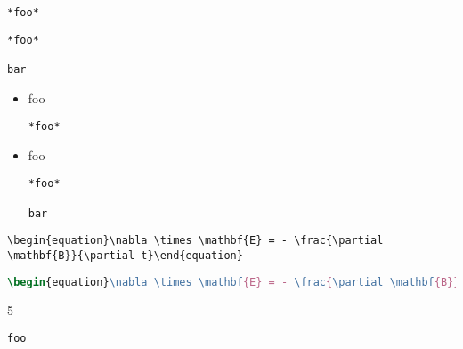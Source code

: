 
\def\mytitle{Fenced Code Blocks}


\begin{verbatim}
*foo*
\end{verbatim}

\begin{verbatim}
*foo*

bar
\end{verbatim}

\begin{itemize}
\item foo

\begin{verbatim}
*foo*
\end{verbatim}

\item foo

\begin{verbatim}
*foo*

bar
\end{verbatim}

\end{itemize}

\begin{verbatim}
\begin{equation}\nabla \times \mathbf{E} = - \frac{\partial \mathbf{B}}{\partial t}\end{equation}
\end{verbatim}

\begin{lstlisting}[language=latex]
\begin{equation}\nabla \times \mathbf{E} = - \frac{\partial \mathbf{B}}{\partial t}\end{equation}
\end{lstlisting}

5

\begin{verbatim}
foo
\end{verbatim}



